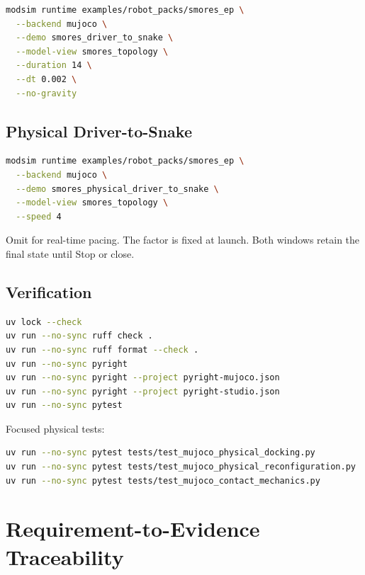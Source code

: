 \begin{lstlisting}[language=bash]
modsim runtime examples/robot_packs/smores_ep \
  --backend mujoco \
  --demo smores_driver_to_snake \
  --model-view smores_topology \
  --duration 14 \
  --dt 0.002 \
  --no-gravity
\end{lstlisting}

\subsection{Physical Driver-to-Snake}

\begin{lstlisting}[language=bash]
modsim runtime examples/robot_packs/smores_ep \
  --backend mujoco \
  --demo smores_physical_driver_to_snake \
  --model-view smores_topology \
  --speed 4
\end{lstlisting}

Omit \code{--speed} for real-time pacing. The factor is fixed at launch. Both windows
retain the final state until Stop or close.

\subsection{Verification}

\begin{lstlisting}[language=bash]
uv lock --check
uv run --no-sync ruff check .
uv run --no-sync ruff format --check .
uv run --no-sync pyright
uv run --no-sync pyright --project pyright-mujoco.json
uv run --no-sync pyright --project pyright-studio.json
uv run --no-sync pytest
\end{lstlisting}

Focused physical tests:

\begin{lstlisting}[language=bash]
uv run --no-sync pytest tests/test_mujoco_physical_docking.py
uv run --no-sync pytest tests/test_mujoco_physical_reconfiguration.py
uv run --no-sync pytest tests/test_mujoco_contact_mechanics.py
\end{lstlisting}

\section{Requirement-to-Evidence Traceability}
\label{app:traceability}

